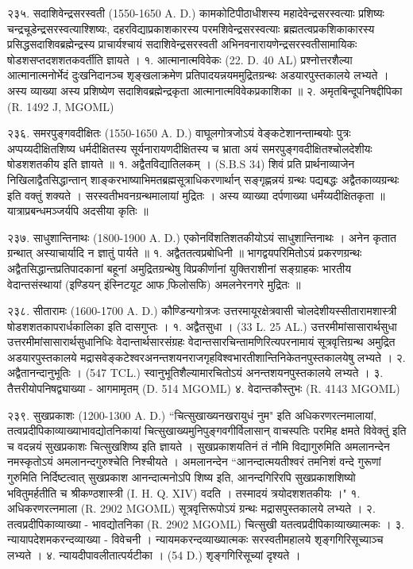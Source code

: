 २३५. सदाशिवेन्द्रसरस्वती (1550-1650 A. D.)
कामकोटिपीठाधीशस्य महादेवेन्द्रसरस्वत्याः प्रशिष्यः चन्द्रचूडेन्द्रसरस्वत्याश्शिष्यः, दहरविद्याप्रकाशकारस्य परमशिवेन्द्रसरस्वत्याः ब्रह्मतत्वप्रकशिकाकारस्य प्रसिद्धसदाशिवब्रह्मेन्द्रस्य प्राचार्यश्चायं सदाशिवेन्द्रसरस्वती अभिनवनारायणेन्द्रसरस्वतीसामायिकः षोडशसप्तदशशतकवर्तीति ज्ञायते ।
१. आत्मानात्मविवेकः (22. D. 40 AL)
प्रश्नोत्तरशैल्या आत्मानात्मनोर्भेदं दुःखनिदानञ्च शृङ्खलाक्रमेण प्रतिपादयन्नयममुद्रितग्रन्थः अडयारपुस्तकालये लभ्यते । अस्य व्याख्या अस्य प्रशिष्येण सदाशिवब्रह्मेन्द्रकृता आत्मानात्मविवेकप्रकाशिका ॥
२. अमृतबिन्दूपनिषद्दीपिका (R. 1492 J, MGOML)

२३६. समरपुङ्गवदीक्षितः (1550-1650 A. D.)
वाघूलगोत्रजोऽयं वेङ्कटेशानन्ताम्बयोः पुत्रः अप्पय्यदीक्षितशिष्य धर्मदीक्षितस्य सूर्यनारायणदीक्षितस्य च भ्राता अयं समरपुङ्गवदीक्षितश्चोलदेशीयः षोडशशतकीय इति ज्ञायते ॥
१. अद्वैतविद्यातिलकम् । (S.B.S 34)
शिवं प्रति प्रार्थनाव्याजेन निखिलाद्वैतसिद्धान्तान् शाङ्करभाष्याभिमतब्रह्मसूत्राधिकरणार्थान् सङ्गृह्णन्नयं ग्रन्थः पद्यबद्धः अद्वैतकाव्यग्रन्थः इति वक्तुं शक्यते । सरस्वतीभवनग्रन्थमालायां मुद्रितः । अस्य व्याख्या दर्पणाख्या धर्मंय्यदीक्षितकृता ॥ यात्राप्रबन्धमञ्जर्यपि अदसीया कृतिः ॥

२३७. साधुशान्तिनाथः (1800-1900 A. D.)
एकोनविंशतिशतकीयोऽयं साधुशान्तिनाथः । अनेन कृतात ग्रन्थात् अस्याचार्यादि न ज्ञातुं पार्यते ॥
१. अद्वैततत्वप्रबोधिनी ॥ भागद्वयपरिमितोऽयं प्रकरणग्रन्थः अद्वैतसिद्धान्तप्रतिपादकानां बहूनां अमुद्रितग्रन्थेषु विप्रकीर्णानां युक्तिराशीनां सङ्ग्राहकः भारतीय वेदान्तसंस्थायां (इण्डियन् इंस्निटयूट आफ फि़लोसफि) अमलनेरनगरे मुद्रितः ॥

२३८. सीतारामः (1600-1700 A. D.)
कौण्डिन्यगोत्रजः उत्तरमायूरक्षेत्रवासी चोलदेशीयस्सीतारामशास्त्री षोडशशतकापरार्धकालिका इति दासगुप्तः ।
१. अद्वैतसुधा । (33 L. 25 AL.)
उत्तरमीमांसासारार्थसुधा उत्तरमीमांसासारार्थसुधानिधिः वेदान्तार्थसारसंग्रहः वेदान्तसारचिन्तामणिरित्यपरनामायं सूत्रवृत्तिग्रन्थ अमुद्रित अडयारपुस्तकालये मद्रासवेङ्कटेश्वरअनन्तशयनराजगृहविश्वभारतीशान्तिनिकेतनपुस्तकालयेषु लभ्यते । 
२. अद्वैतानन्दानुभूतिः । (547 TCL.) स्वानुभूतिशैल्यामारचितोऽयं अनन्तशयनपुस्तकालये लभ्यते ।
३. तैत्तरीयोपनिषद्व्याख्या - आगमामृतम् (D. 514 MGOML)
४. वेदान्तकौस्तुभः (R. 4143 MGOML)

२३९. सुखप्रकाशः (1200-1300 A. D.)
``चित्सुखाख्यनखरायुधं नुम" इति अधिकरणरत्नमालायां, तत्वप्रदीपिकाव्याख्याभावद्योतनिकायां चित्सुखाख्यमुनिपुङ्गवगीर्विलासान् वाचस्पतिः परमिह क्षमते विवेक्तुं इति च वदन्नयं सुखप्रकाशः चित्सुखशिष्य इति ज्ञायते । सुखप्रकाशयतिनं तं नौमि विद्यागुरुमिति अमलानन्देन नमस्कृतोऽयं अमलानन्दगुरुश्चेति निश्चीयते । अमलानन्देन ``आनन्दात्मयतीश्वरं तमनिशं वन्दे गुरूणां गुरुमिति निर्दिष्टत्वात् सुखप्रकाश आनन्दात्मनोऽपि शिष्य इति, आनन्दगिरिरपि सुखप्रकाशशिष्यो भवितुमर्हतीति च श्रीकण्ठशास्त्री (I. H. Q. XIV) वदति । तस्मादयं त्रयोदशशतकीयः ।"
१. अधिकरणरत्नमाला (R. 2902 MGOML) सूत्रवृत्तिरूपोऽयं ग्रन्थः मद्रासपुस्तकालये लभ्यते ।
२. तत्वप्रदीपिकाव्याख्या - भावद्योतनिका (R. 2902 MGOML) चित्सुखी यतत्वप्रदीपिकाव्याख्यात्मकः ।
३. न्यायापदेशमकरन्दव्याख्या - विवेचनी । न्यायमकरन्दव्याख्यात्मकः सरस्वतीमहालये शृङ्गगिरिसूच्याञ्च लभ्यते ।
४. न्यायदीपावलीतात्पर्यटीका । (54 D.) शृङ्गगिरिसूच्यां दृश्यते ।

